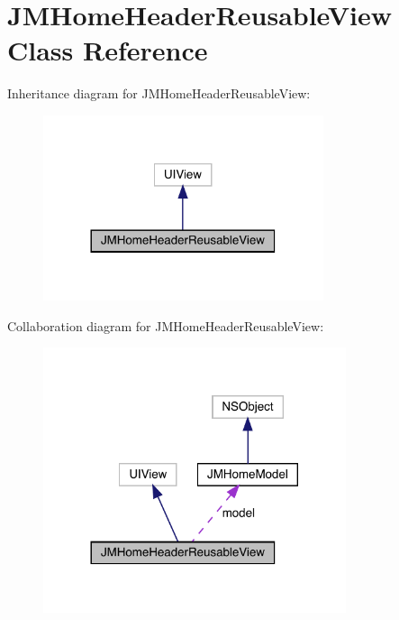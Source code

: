 \hypertarget{interface_j_m_home_header_reusable_view}{}\section{J\+M\+Home\+Header\+Reusable\+View Class Reference}
\label{interface_j_m_home_header_reusable_view}


Inheritance diagram for J\+M\+Home\+Header\+Reusable\+View\+:\nopagebreak
\begin{figure}[H]
\begin{center}
\leavevmode
\includegraphics[width=233pt]{interface_j_m_home_header_reusable_view__inherit__graph}
\end{center}
\end{figure}


Collaboration diagram for J\+M\+Home\+Header\+Reusable\+View\+:\nopagebreak
\begin{figure}[H]
\begin{center}
\leavevmode
\includegraphics[width=252pt]{interface_j_m_home_header_reusable_view__coll__graph}
\end{center}
\end{figure}
